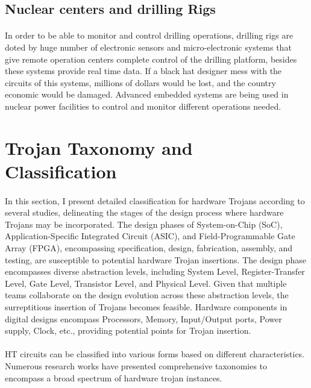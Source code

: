 \subsection{Nuclear centers and drilling Rigs}
\paragraph*{}
In order to be able to monitor and control drilling operations, drilling rigs are doted by huge number of electronic sensors and micro-electronic systems that give remote operation centers complete control of the drilling platform, besides these systems provide real time data. If a black hat designer mess with the circuits of this systems, millions of dollars would be lost, and the country economic would be damaged. Advanced embedded systems are being used in nuclear power facilities to control and monitor different operations needed.
\section{Trojan Taxonomy and Classification}
\paragraph*{}
In this section, I present detailed classification for hardware Trojans according to several studies, delineating the stages of the design process where hardware Trojans may be incorporated. The design phases of System-on-Chip (SoC), Application-Specific Integrated Circuit (ASIC), and Field-Programmable Gate Array (FPGA), encompassing specification, design, fabrication, assembly, and testing, are susceptible to potential hardware Trojan insertions. The design phase encompasses diverse abstraction levels, including System Level, Register-Transfer Level, Gate Level, Transistor Level, and Physical Level. Given that multiple teams collaborate on the design evolution across these abstraction levels, the surreptitious insertion of Trojans becomes feasible. Hardware components in digital designs encompass Processors, Memory, Input/Output ports, Power supply, Clock, etc., providing potential points for Trojan insertion.
\paragraph*{}
HT circuits can be classified into various forms based on different characteristics. Numerous research works have presented comprehensive taxonomies to encompass a broad spectrum of hardware trojan instances.
